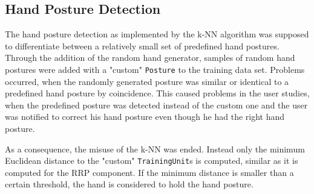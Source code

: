 \subsection{Hand Posture Detection}

The hand posture detection as implemented by the k-NN algorithm was supposed to differentiate between a relatively small set of predefined hand postures. Through the addition of the random hand generator, samples of random hand postures were added with a "custom" \texttt{Posture} to the training data set. Problems occurred, when the randomly generated posture was similar or identical to a predefined hand posture by coincidence. This caused problems in the user studies, when the predefined posture was detected instead of the custom one and the user was notified to correct his hand posture even though he had the right hand posture. 

As a consequence, the misuse of the k-NN was ended. Instead only the minimum Euclidean distance to the "custom" \texttt{TrainingUnit}s is computed, similar as it is computed for the RRP component. If the minimum distance is smaller than a certain threshold, the hand is considered to hold the hand posture.